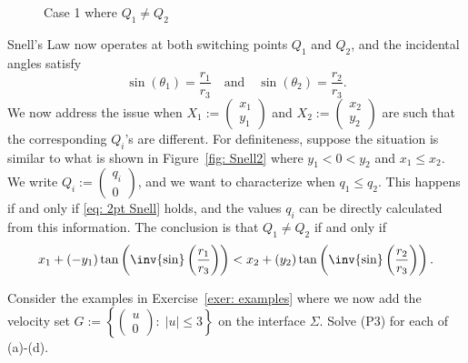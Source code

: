 \documentclass[12pt]{article}
\begin{document}
\begin{figure}[h]
\caption{Case 1 where $Q_1\not= Q_2$}
\end{figure}
Snell's Law now operates at both switching points $Q_1$ and $Q_2$, and the incidental angles
 satisfy
\begin{equation}\label{eq: 2pt Snell}
\sin(\theta_1)=\frac{r_1}{r_3}\quad\text{and}\quad
\sin(\theta_2)=\frac{r_2}{r_3}.
\end{equation}
We now address the issue when $X_1:=\begin{pmatrix} x_1 \\ y_1\end{pmatrix}$ and  $X_2:=\begin{pmatrix} x_2 \\ y_2\end{pmatrix}$  are such that the corresponding $Q_i$'s are different.  For definiteness, suppose the situation is similar to what is shown in Figure~\ref{fig: Snell2} where $y_1<0<y_2$ and $x_1\leq x_2$.  We write $Q_i:=\begin{pmatrix} q_i \\ 0\end{pmatrix}$, and we want to characterize when $q_1\leq q_2$.  This happens if and only if \eqref{eq: 2pt Snell} holds, and the values $q_i$ can be directly calculated from this information.  The conclusion is that $Q_1\not=Q_2$ if and only if
\[
x_1+(-y_1)\tan\left(\inv{\sin}\left(\frac{r_1}{r_3}\right)\right)
< x_2+(y_2)\tan\left(\inv{\sin}\left(\frac{r_2}{r_3}\right)\right).
\]

{\blue
\begin{exer}
Consider the examples in Exercise~\ref{exer: examples} where we now add the velocity set $G:=\left\{\begin{pmatrix} u \\ 0 \end{pmatrix}:\;|u|\leq 3\right\}$ on the interface $\Sigma$.  Solve (P3) for each of (a)-(d).
\end{exer}
}





\end{document}
